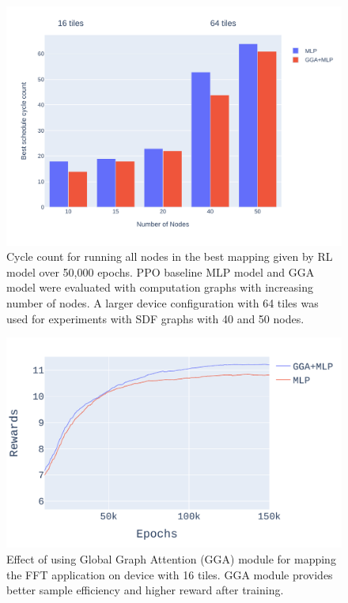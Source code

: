 \begin{figure}[tb]
  \centering
  \includegraphics[width=\linewidth]{fig/nodes_graph.pdf}
  \caption{Cycle count for running all nodes in the best mapping given by RL model over 50,000 epochs. 
  PPO baseline MLP model and GGA model were evaluated with computation graphs with increasing number of nodes. 
  A larger device configuration with 64 tiles was used for experiments with SDF graphs with 40 and 50 nodes. }
  \label{fig:nodes_graph}
\end{figure}

\begin{figure}[tb]
  \centering
  \includegraphics[width=\linewidth]{fig/plot_gnn_atten_ppo.pdf}
  \caption{Effect of using Global Graph Attention (GGA) module for mapping the FFT application on device with 16 tiles. 
  GGA module provides better sample efficiency and higher reward after training. }
  \label{fig:ifft_rewards}
\end{figure}

